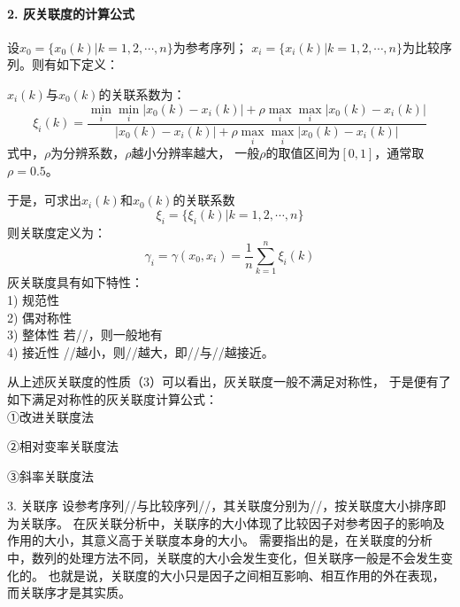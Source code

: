 \paragraph*{2. 灰关联度的计算公式}
设$x_0=\{x_0(k)|k=1,2, \cdots ,n\}$为参考序列；
$x_i=\{x_i(k)|k=1,2, \cdots ,n\}$为比较序列。则有如下定义：

$x_i(k)$与$x_0(k)$的关联系数为：
\begin{equation}
\xi_i(k)=\frac{\underset{i}{\min}\underset{i}{\min}|x_0(k)-x_i(k)|
				+\rho\underset{i}{\max}\underset{i}{\max}|x_0(k)-x_i(k)|}
			  {|x_0(k)-x_i(k)|
				+\rho\underset{i}{\max}\underset{i}{\max}|x_0(k)-x_i(k)|}
\end{equation}
式中，$\rho$为分辨系数，$\rho$越小分辨率越大，
一般$\rho$的取值区间为$[0,1]$，通常取$\rho=0.5$。

于是，可求出$x_i(k)$和$x_0(k)$的关联系数
\begin{equation}
\xi_i=\{\xi_i(k)|k=1,2,\cdots,n\}
\end{equation}
则关联度定义为：
\begin{equation}
\gamma_i=\gamma(x_0,x_i)=\frac{1}{n}\sum_{k=1}^{n}\xi_i(k)
\end{equation}
灰关联度具有如下特性： \\
1) 规范性
\\
2) 偶对称性
\\   
3) 整体性
   若//，则一般地有
\\  
4) 接近性
   //越小，则//越大，即//与//越接近。

从上述灰关联度的性质（3）可以看出，灰关联度一般不满足对称性，
于是便有了如下满足对称性的灰关联度计算公式：\\
   ①改进关联度法
   
   ②相对变率关联度法
  
   ③斜率关联度法
  
   
   
   3. 关联序
   设参考序列//与比较序列//，其关联度分别为//，按关联度大小排序即为关联序。
   在灰关联分析中，关联序的大小体现了比较因子对参考因子的影响及作用的大小，其意义高于关联度本身的大小。
   需要指出的是，在关联度的分析中，数列的处理方法不同，关联度的大小会发生变化，但关联序一般是不会发生变化的。
也就是说，关联度的大小只是因子之间相互影响、相互作用的外在表现，而关联序才是其实质。
